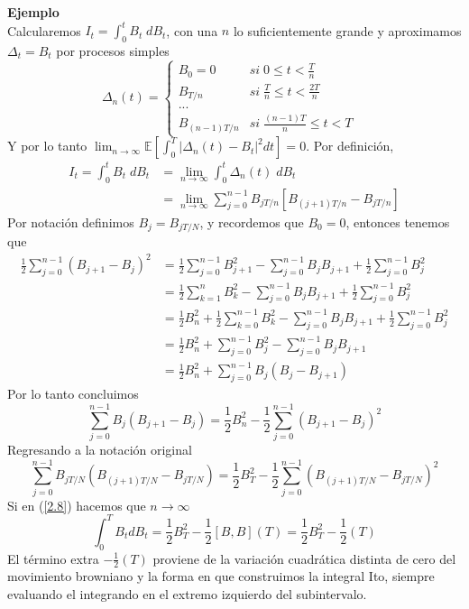 \documentclass[11pt,notitlepage]{article}
\begin{document}
\textbf{Ejemplo}\\
Calcularemos \(I_{t}= \int_{0}^{t} B_t \;dB_t\), con una \(n\) lo suficientemente grande y aproximamos \(\Delta_{t}=B_t\) por procesos simples
\[\Delta_n(t)=\left\{\begin{matrix}
B_0=0 &  si\; 0\leq t < \frac{T}{n} \\ 
B_{T/n} & si\; \frac{T}{n} \leq t < \frac{2T}{n}\\ 
... & \\ 
B_{(n-1)T/n} & si\; \frac{(n-1)T}{n} \leq t < T & 
\end{matrix}\right.\]
Y por lo tanto \(\lim_{n\rightarrow \infty }\mathbb{E}\left[\int_{0}^{T}\left | \Delta _{n}(t)-B_{t} \right |^{2} dt\right] =0\). Por definición,
\begin{align}
I_{t}= \int_{0}^{t} B_{t} \;dB_t &= \lim_{n \to \infty} \int_{0}^{t} \Delta_n(t) \;dB_{t} \label{2.7}\\ 
 &= \lim_{n \to \infty}\sum_{j=0}^{n-1} B_{jT/n}[B_{(j+1)T/n}-B_{jT/n}] \label{2.8}
\end{align}
 Por notación definimos \(B_j=B_{jT/N}\), y recordemos que \(B_0=0\), entonces tenemos que
 \begin{align*}
 \frac{1}{2}\sum_{j=0}^{n-1}(B_{j+1}-B_{j})^{2}&= \frac{1}{2}\sum_{j=0}^{n-1}B_{j+1}^{2}-\sum_{j=0}^{n-1}B_jB_{j+1}+ \frac{1}{2}\sum_{j=0}^{n-1}B_{j}^{2}\\
 &=\frac{1}{2}\sum_{k=1}^{n}B_{k}^{2}-\sum_{j=0}^{n-1}B_jB_{j+1}+ \frac{1}{2}\sum_{j=0}^{n-1}B_{j}^{2}\\
 &=\frac{1}{2} B_n^2  + \frac{1}{2}\sum_{k=0}^{n-1}B_{k}^{2}-\sum_{j=0}^{n-1}B_jB_{j+1}+ \frac{1}{2}\sum_{j=0}^{n-1}B_{j}^{2}\\
 &=\frac{1}{2} B_n^2  + \sum_{j=0}^{n-1}B_{j}^{2}-\sum_{j=0}^{n-1}B_jB_{j+1} \\
  &=\frac{1}{2} B_n^2  + \sum_{j=0}^{n-1}B_{j}(B_j-B_{j+1})
 \end{align*}  
Por lo tanto concluimos 
\[\sum_{j=0}^{n-1}B_{j}(B_{j+1}-B_{j})=\frac{1}{2} B_n^2-\frac{1}{2}\sum_{j=0}^{n-1}(B_{j+1}-B_{j})^{2}\]
Regresando a la notación original
\[\sum_{j=0}^{n-1}B_{jT/N}(B_{(j+1)T/N}-B_{jT/N})=\frac{1}{2} B_T^2-\frac{1}{2}\sum_{j=0}^{n-1}(B_{(j+1)T/N}-B_{jT/N})^{2}\]
Si en (\ref{2.8}) hacemos que \(n \to \infty\)
\[\int_{0}^{T}B_tdB_t=\frac{1}{2}B_T^2-\frac{1}{2}[B,B](T)=\frac{1}{2}B_T^2-\frac{1}{2}(T)\]
El término extra \(-\frac{1}{2}(T)\) proviene de la variación cuadrática distinta de cero del movimiento browniano y la forma en que construimos la integral Ito, siempre evaluando el integrando en el extremo izquierdo del subintervalo.
\end{document}
